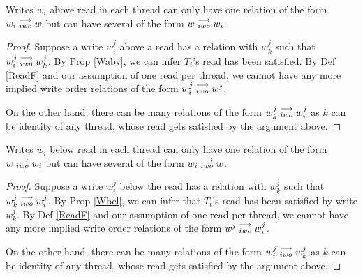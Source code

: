 
    \begin{property}
        \label{prop7}
        Writes $w_i$ above read in each thread can only have one relation of the form $w_i\stackrel{\longrightarrow}{_{iwo}}w$ but can have several of the form $w\stackrel{\longrightarrow}{_{iwo}}w_i$. 
    \end{property}

    \begin{proof}
        Suppose a write $w_i^j$ above a read has a relation with $w_k^j$ such that $w_i^j\stackrel{\longrightarrow}{_{iwo}}w_k^j$. By Prop \ref{Wabv}, we can infer $T_i$'s read has been satisfied. By Def \ref{ReadF} and our assumption of one read per thread, we cannot have any more implied write order relations of the form $w_i^j\stackrel{\longrightarrow}{_{iwo}}w^j$. 

        On the other hand, there can be many relations of the form $w_k^j\stackrel{\longrightarrow}{_{iwo}}w_i^j$ as $k$ can be identity of any thread, whose read gets satisfied by the argument above.
    \end{proof}

   
    \begin{property}
        \label{prop8}
        Writes $w_i$ below read in each thread can only have one relation of the form $w\stackrel{\longrightarrow}{_{iwo}}w_i$ but can have several of the form $w_i\stackrel{\longrightarrow}{_{iwo}}w$. 
    \end{property}

    \begin{proof}
        Suppose a write $w_i^j$ below the read has a relation with $w_k^j$ such that $w_k^j\stackrel{\longrightarrow}{_{iwo}}w_i^j$. By Prop \ref{Wbel}, we can infer that $T_i$'s read has been satisfied by write $w_k^j$. By Def \ref{ReadF} and our assumption of one read per thread, we cannot have any more implied write order relations of the form $w^j\stackrel{\longrightarrow}{_{iwo}}w_i^j$. 

        On the other hand, there can be many relations of the form $w_i^j\stackrel{\longrightarrow}{_{iwo}}w_k^j$ as $k$ can be identity of any thread, whose read gets satisfied by the argument above.  
    \end{proof}


